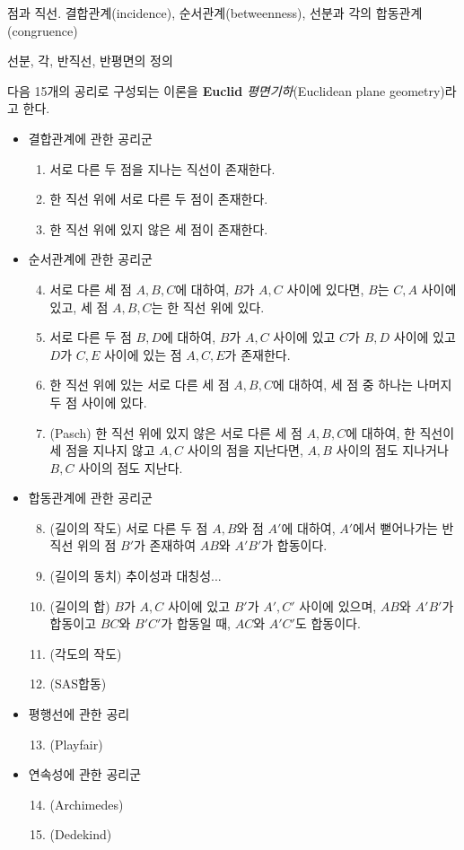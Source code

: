 \documentclass{../../large}
\begin{document}
\begin{axiom*}
점과 직선.
결합관계(incidence), 순서관계(betweenness), 선분과 각의 합동관계(congruence)

선분, 각, 반직선, 반평면의 정의

다음 15개의 공리로 구성되는 이론을 \textbf{Euclid}\emph{ 평면기하}(Euclidean plane geometry)라고 한다.

\begin{itemize}
\item 결합관계에 관한 공리군
\begin{enumerate}
\item 서로 다른 두 점을 지나는 직선이 존재한다.
\item 한 직선 위에 서로 다른 두 점이 존재한다.
\item 한 직선 위에 있지 않은 세 점이 존재한다.
\end{enumerate}
\item 순서관계에 관한 공리군
\begin{enumerate}
\setcounter{enumi}{3}
\item 서로 다른 세 점 $A,B,C$에 대하여, $B$가 $A,C$ 사이에 있다면, $B$는 $C,A$ 사이에 있고, 세 점 $A,B,C$는 한 직선 위에 있다.
\item 서로 다른 두 점 $B,D$에 대하여, $B$가 $A,C$ 사이에 있고 $C$가 $B,D$ 사이에 있고 $D$가 $C,E$ 사이에 있는 점 $A,C,E$가 존재한다.
\item 한 직선 위에 있는 서로 다른 세 점 $A,B,C$에 대하여, 세 점 중 하나는 나머지 두 점 사이에 있다.
\item (Pasch) 한 직선 위에 있지 않은 서로 다른 세 점 $A,B,C$에 대하여, 한 직선이 세 점을 지나지 않고 $A,C$ 사이의 점을 지난다면, $A,B$ 사이의 점도 지나거나 $B,C$ 사이의 점도 지난다.
\end{enumerate}
\item 합동관계에 관한 공리군
\begin{enumerate}
\setcounter{enumi}{7}
\item (길이의 작도) 서로 다른 두 점 $A,B$와 점 $A'$에 대하여, $A'$에서 뻗어나가는 반직선 위의 점 $B'$가 존재하여 $AB$와 $A'B'$가 합동이다.
\item (길이의 동치) 추이성과 대칭성...
\item (길이의 합) $B$가 $A,C$ 사이에 있고 $B'$가 $A',C'$ 사이에 있으며, $AB$와 $A'B'$가 합동이고 $BC$와 $B'C'$가 합동일 때, $AC$와 $A'C'$도 합동이다.
\item (각도의 작도)
\item (SAS합동)
\end{enumerate}
\item 평행선에 관한 공리
\begin{enumerate}
\setcounter{enumi}{12}
\item (Playfair)
\end{enumerate}
\item 연속성에 관한 공리군
\begin{enumerate}
\setcounter{enumi}{13}
\item (Archimedes)
\item (Dedekind)
\end{enumerate}
\end{itemize}
\end{axiom*}
\end{document}
